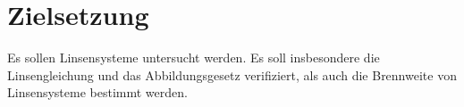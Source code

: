 \section{Zielsetzung}
\label{sec:Zielsetzung}
Es sollen Linsensysteme untersucht werden. Es soll insbesondere die Linsengleichung und das Abbildungsgesetz verifiziert, als auch die Brennweite von Linsensysteme bestimmt werden.
